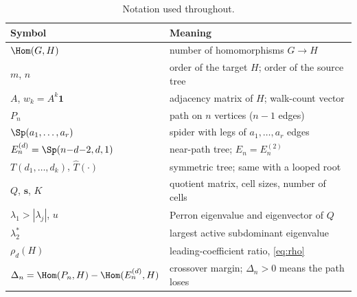 \begin{table}[H]
\centering
\caption{Notation used throughout.}
\label{tab:notation}
\begin{tabular}{@{}ll@{}}
  \toprule
  Symbol & Meaning \\
  \midrule
  $\Hom(G,H)$ & number of homomorphisms $G \to H$ \\
  $m$, $n$ & order of the target $H$; order of the source tree \\
  $A$, $w_k = A^k\mathbf{1}$ & adjacency matrix of $H$; walk-count vector \\
  $P_n$ & path on $n$ vertices ($n-1$ edges) \\
  $\Sp(a_1,\dots,a_r)$ & spider with legs of $a_1,\dots,a_r$ edges \\
  $E_n^{(d)} = \Sp(n{-}d{-}2, d, 1)$ & near-path tree; $E_n = E_n^{(2)}$ \\
  $T(d_1,\dots,d_k)$, $\hat T(\cdot)$ & symmetric tree; same with a looped root \\
  $Q$, $\mathbf{s}$, $K$ & quotient matrix, cell sizes, number of cells \\
  $\lambda_1 > |\lambda_j|$, $u$ & Perron eigenvalue and eigenvector of $Q$ \\
  $\lambda_2^{*}$ & largest active subdominant eigenvalue \\
  $\rho_d(H)$ & leading-coefficient ratio, \eqref{eq:rho} \\
  $\Delta_n = \Hom(P_n,H) - \Hom(E_n^{(d)},H)$ & crossover margin; $\Delta_n > 0$ means the path loses \\
  \bottomrule
\end{tabular}
\end{table}
